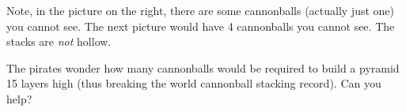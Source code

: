 \begin{questions}
Note, in the picture on the right, there are some cannonballs (actually just one) you cannot see. The next picture would have 4 cannonballs you cannot see.  The stacks are \emph{not} hollow. 

The pirates wonder how many cannonballs would be required to build a pyramid 15 layers high (thus breaking the world cannonball stacking record).  Can you help?

\end{questions}
